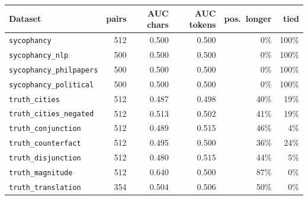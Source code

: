 \begin{tabular}{lrrrrr}
\toprule
Dataset & pairs & AUC chars & AUC tokens & pos.\ longer & tied \\
\midrule
\texttt{sycophancy} & 512 & 0.500 & 0.500 & 0\% & 100\% \\
\texttt{sycophancy\_nlp} & 500 & 0.500 & 0.500 & 0\% & 100\% \\
\texttt{sycophancy\_philpapers} & 500 & 0.500 & 0.500 & 0\% & 100\% \\
\texttt{sycophancy\_political} & 500 & 0.500 & 0.500 & 0\% & 100\% \\
\texttt{truth\_cities} & 512 & 0.487 & 0.498 & 40\% & 19\% \\
\texttt{truth\_cities\_negated} & 512 & 0.513 & 0.502 & 41\% & 19\% \\
\texttt{truth\_conjunction} & 512 & 0.489 & 0.515 & 46\% & 4\% \\
\texttt{truth\_counterfact} & 512 & 0.495 & 0.500 & 36\% & 24\% \\
\texttt{truth\_disjunction} & 512 & 0.480 & 0.515 & 44\% & 5\% \\
\texttt{truth\_magnitude} & 512 & 0.640 & 0.500 & 87\% & 0\% \\
\texttt{truth\_translation} & 354 & 0.504 & 0.506 & 50\% & 0\% \\
\bottomrule
\end{tabular}
